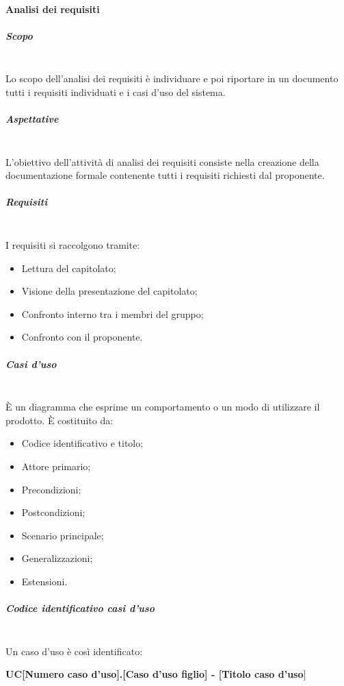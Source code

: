 \paragraph{Analisi dei requisiti}
\subparagraph{Scopo} \mbox{} \\
Lo scopo dell'analisi dei requisiti è individuare e poi riportare in un documento tutti i requisiti individuati e i casi d'uso del sistema.
\subparagraph{Aspettative} \mbox{} \\
L'obiettivo dell'attività di analisi dei requisiti consiste nella creazione della documentazione formale contenente tutti i requisiti richiesti dal proponente.
\subparagraph{Requisiti} \mbox{} \\
I requisiti si raccolgono tramite:
\begin{itemize}
\item Lettura del capitolato;
\item Visione della presentazione del capitolato;
\item Confronto interno tra i membri del gruppo;
\item Confronto con il proponente.
\end{itemize}
\subparagraph{Casi d'uso} \mbox{} \\
È un diagramma che esprime un comportamento o un modo di utilizzare il prodotto. È costituito da:
\begin{itemize}
\item Codice identificativo e titolo;
\item Attore primario;
\item Precondizioni;
\item Postcondizioni;
\item Scenario principale;
\item Generalizzazioni;
\item Estensioni.
\end{itemize}
\subparagraph{Codice identificativo casi d'uso} \mbox{} \\
Un caso d'uso è così identificato:

\begin{center}
\textbf{UC[Numero caso d'uso].[Caso d'uso figlio] - [Titolo caso d'uso}]
\end{center}
		
